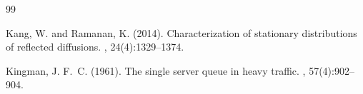 \documentclass[11pt]{article}
\theoremstyle{definition}
\begin{document}
\begin{thebibliography}{99}
%





Kang, W. and Ramanan, K. (2014).
\newblock Characterization of stationary distributions of reflected diffusions.
, 24(4):1329--1374.


Kingman, J. F.~C. (1961).
\newblock The single server queue in heavy traffic.
, 57(4):902--904.



\end{thebibliography}
\end{document}
